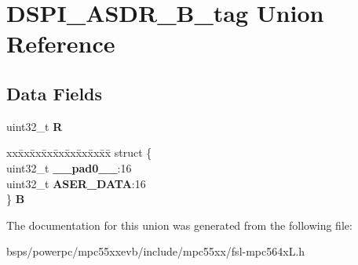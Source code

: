 \hypertarget{unionDSPI__ASDR__32B__tag}{}\section{D\+S\+P\+I\+\_\+\+A\+S\+D\+R\+\_\+B\+\_\+tag Union Reference}
\label{unionDSPI__ASDR__32B__tag}
\subsection*{Data Fields}
\begin{DoxyCompactItemize}
\item 
\mbox{\label{unionDSPI__ASDR__32B__tag_afb62b6c023e706c8e4e57d37167925b0}} 
uint32\+\_\+t {\bfseries R}
\item 
\mbox{\label{unionDSPI__ASDR__32B__tag_a779b9621c4b658b4e953c186e6850b15}} 
\begin{tabbing}
xx\=xx\=xx\=xx\=xx\=xx\=xx\=xx\=xx\=\kill
struct \{\\
\>uint32\_t {\bfseries \_\_pad0\_\_}:16\\
\>uint32\_t {\bfseries ASER\_DATA}:16\\
\} {\bfseries B}\\

\end{tabbing}\end{DoxyCompactItemize}


The documentation for this union was generated from the following file\+:\begin{DoxyCompactItemize}
\item 
bsps/powerpc/mpc55xxevb/include/mpc55xx/fsl-\/mpc564x\+L.\+h\end{DoxyCompactItemize}
